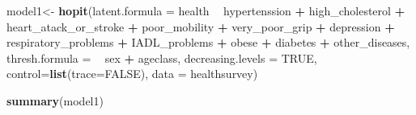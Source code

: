 \documentclass[]{article}
\newenvironment{Shaded}{\begin{snugshade}}{\end{snugshade}}
\newcommand{\DataTypeTok}[1]{\textcolor[rgb]{0.13,0.29,0.53}{#1}}
\newcommand{\KeywordTok}[1]{\textcolor[rgb]{0.13,0.29,0.53}{\textbf{#1}}}
\newcommand{\NormalTok}[1]{#1}
\newcommand{\OperatorTok}[1]{\textcolor[rgb]{0.81,0.36,0.00}{\textbf{#1}}}
\newcommand{\OtherTok}[1]{\textcolor[rgb]{0.56,0.35,0.01}{#1}}
\newcommand{\StringTok}[1]{\textcolor[rgb]{0.31,0.60,0.02}{#1}}
\begin{document}
\begin{Shaded}
\begin{Highlighting}[]
\NormalTok{model1<-}\StringTok{ }\KeywordTok{hopit}\NormalTok{(}\DataTypeTok{latent.formula =}\NormalTok{ health }\OperatorTok{~}\StringTok{ }\NormalTok{hypertenssion }\OperatorTok{+}\StringTok{ }\NormalTok{high_cholesterol }\OperatorTok{+}\StringTok{ }
\StringTok{                             }\NormalTok{heart_atack_or_stroke }\OperatorTok{+}\StringTok{ }\NormalTok{poor_mobility }\OperatorTok{+}\StringTok{ }\NormalTok{very_poor_grip }\OperatorTok{+}\StringTok{ }
\StringTok{                             }\NormalTok{depression }\OperatorTok{+}\StringTok{ }\NormalTok{respiratory_problems }\OperatorTok{+}\StringTok{ }
\StringTok{                             }\NormalTok{IADL_problems }\OperatorTok{+}\StringTok{ }\NormalTok{obese }\OperatorTok{+}\StringTok{ }\NormalTok{diabetes }\OperatorTok{+}\StringTok{ }\NormalTok{other_diseases, }
               \DataTypeTok{thresh.formula =} \OperatorTok{~}\StringTok{ }\NormalTok{sex }\OperatorTok{+}\StringTok{ }\NormalTok{ageclass,}
               \DataTypeTok{decreasing.levels =} \OtherTok{TRUE}\NormalTok{,}
               \DataTypeTok{control=}\KeywordTok{list}\NormalTok{(}\DataTypeTok{trace=}\OtherTok{FALSE}\NormalTok{),}
               \DataTypeTok{data =}\NormalTok{ healthsurvey)}

\KeywordTok{summary}\NormalTok{(model1)}
\end{Highlighting}
\end{Shaded}
\end{document}
